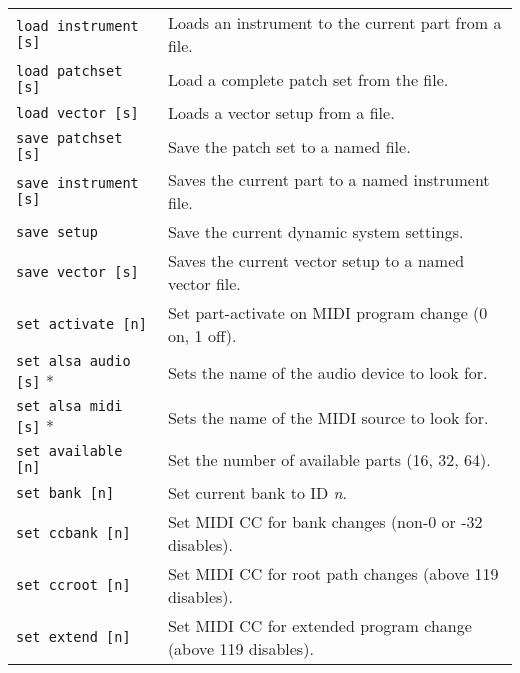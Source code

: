 \begin{table}[H]
\begin{tabular}{l l}
         \texttt{load instrument [s]} &
            Loads an instrument to the current part from a file. \\

         \texttt{load patchset [s]} &
            Load a complete patch set from the file. \\

         \texttt{load vector [s]} &
            Loads a vector setup from a file. \\

         \texttt{save patchset [s]} &
            Save the patch set to a named file. \\

         \texttt{save instrument [s]} &
            Saves the current part to a named instrument file. \\

         \texttt{save setup} &
            Save the current dynamic system settings. \\

         \texttt{save vector [s]} &
            Saves the current vector setup to a named vector file. \\

         \texttt{set activate [n]} &
            Set part-activate on MIDI program change (0 on, 1 off). \\

         \texttt{set alsa audio [s]} * &
            Sets the name of the audio device to look for. \\

         \texttt{set alsa midi [s]} * &
            Sets the name of the MIDI source to look for. \\

         \texttt{set available [n]} &
            Set the number of available parts (16, 32, 64). \\

         \texttt{set bank [n]} &
            Set current bank to ID \textsl{n}. \\

         \texttt{set ccbank [n]} &
            Set MIDI CC for bank changes (non-0 or -32 disables). \\

         \texttt{set ccroot [n]} &
            Set MIDI CC for root path changes (above 119 disables). \\

         \texttt{set extend [n]} &
            Set MIDI CC for extended program change (above 119 disables). \\


\end{tabular}
\end{table}
